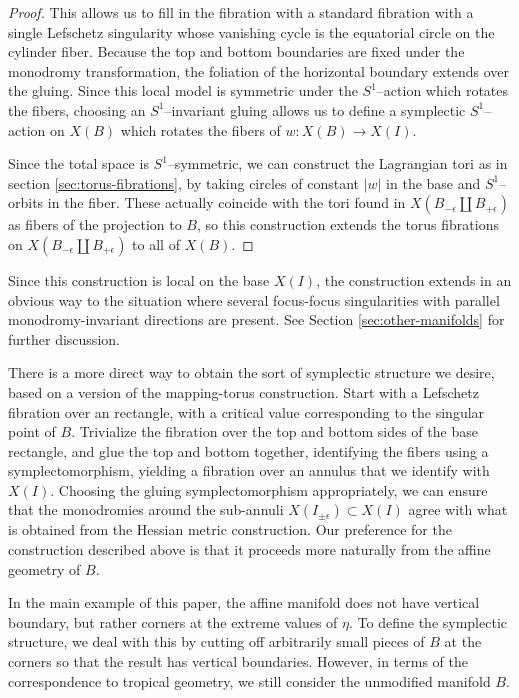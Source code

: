 \documentclass[12pt]{amsart}
\begin{document}
\begin{proof}
This allows us to fill in the fibration with a standard fibration with
a single Lefschetz singularity whose vanishing cycle is the equatorial
circle on the cylinder fiber. Because the top and bottom boundaries are fixed under the monodromy transformation, the foliation of the horizontal boundary extends over the gluing. Since this local model is symmetric
under the $S^1$--action which rotates the fibers, choosing an
$S^1$--invariant gluing allows us to define a symplectic $S^1$--action
on $X(B)$ which rotates the fibers of $w: X(B)\to X(I)$.

Since the total space is $S^1$--symmetric, we can construct the Lagrangian
tori as in section \ref{sec:torus-fibrations}, by taking circles of
constant $|w|$ in the base and $S^1$--orbits in the fiber. These
actually coincide with the tori found in $X(B_{-\epsilon} \coprod
B_{+\epsilon})$ as fibers of the projection to $B$, so this
construction extends the torus fibrations on $X(B_{-\epsilon} \coprod
B_{+\epsilon})$ to all of $X(B)$.
\end{proof}

\begin{remark}
Since this construction is local on the base $X(I)$, the construction
extends in an obvious way to the situation where several focus-focus
singularities with parallel monodromy-invariant directions are
present. See Section \ref{sec:other-manifolds} for further discussion.
\end{remark}

\begin{remark}
  There is a more direct way to obtain the sort of symplectic structure we desire, based on a version of the mapping-torus construction. Start with a Lefschetz fibration over an rectangle, with a critical value corresponding to the singular point of $B$. Trivialize the fibration over the top and bottom sides of the base rectangle, and glue the top and bottom together, identifying the fibers using a symplectomorphism, yielding a fibration over an annulus that we identify with $X(I)$. Choosing the gluing symplectomorphism appropriately, we can ensure that the monodromies around the sub-annuli $X(I_{\pm \epsilon}) \subset X(I)$ agree with what is obtained from the Hessian metric construction. Our preference for the construction described above is that it proceeds more naturally from the affine geometry of $B$.
\end{remark}

\begin{remark}
\label{rem:cut-corner}
In the main example of this paper, the affine manifold does not have
vertical boundary, but rather corners at the extreme values of
$\eta$. To define the symplectic structure, we deal with this by
cutting off arbitrarily small pieces of $B$ at the corners so that the
result has vertical boundaries. However, in terms of the
correspondence to tropical geometry, we still consider the unmodified
manifold $B$.
  \end{remark}
\end{document}
